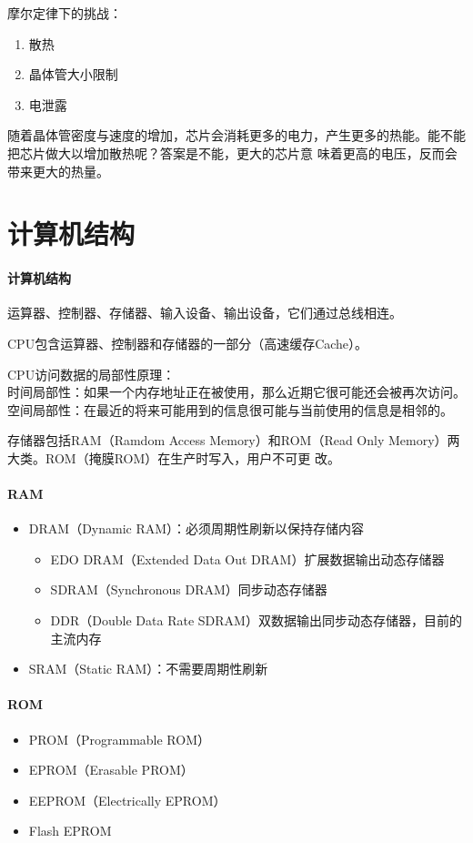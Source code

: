 \documentclass[UTF8]{ctexart}
\begin{document}
摩尔定律下的挑战：
\begin{enumerate}
    \item 散热
    \item 晶体管大小限制
    \item 电泄露
\end{enumerate}

随着晶体管密度与速度的增加，芯片会消耗更多的电力，产生更多的热能。能不能把芯片做大以增加散热呢？答案是不能，更大的芯片意
味着更高的电压，反而会带来更大的热量。

\section{计算机结构}
\paragraph{计算机结构}
运算器、控制器、存储器、输入设备、输出设备，它们通过总线相连。

CPU包含运算器、控制器和存储器的一部分（高速缓存Cache）。

CPU访问数据的局部性原理：\\
时间局部性：如果一个内存地址正在被使用，那么近期它很可能还会被再次访问。\\
空间局部性：在最近的将来可能用到的信息很可能与当前使用的信息是相邻的。

存储器包括RAM（Ramdom Access Memory）和ROM（Read Only Memory）两大类。ROM（掩膜ROM）在生产时写入，用户不可更
改。

\paragraph{RAM}
\begin{itemize}
    \item DRAM（Dynamic RAM）：必须周期性刷新以保持存储内容
        \begin{itemize}
            \item EDO DRAM（Extended Data Out DRAM）扩展数据输出动态存储器
            \item SDRAM（Synchronous DRAM）同步动态存储器
            \item DDR（Double Data Rate SDRAM）双数据输出同步动态存储器，目前的主流内存
        \end{itemize}
    \item SRAM（Static RAM）：不需要周期性刷新
\end{itemize}

\paragraph{ROM}
\begin{itemize}
    \item PROM（Programmable ROM）
    \item EPROM（Erasable PROM）
    \item EEPROM（Electrically EPROM）
    \item Flash EPROM
\end{itemize}
\end{document}

